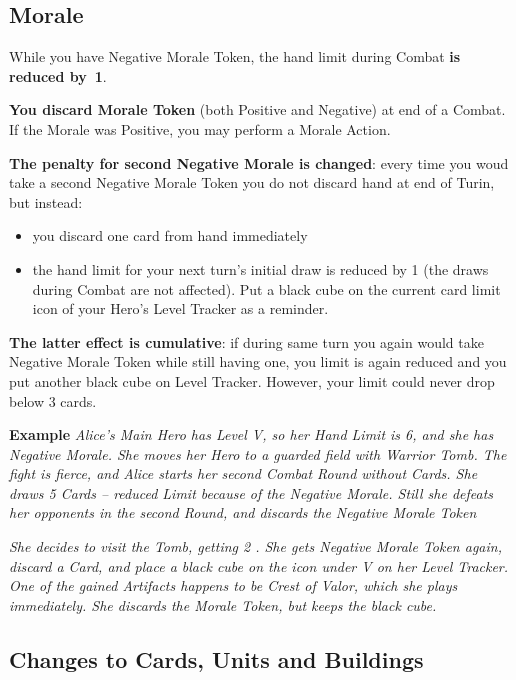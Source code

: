 \begin{multicols*}{2}
    \subsection*{Morale}
    
    While you have Negative Morale Token, the hand limit during Combat \textbf{is reduced by~1}.
    
    \textbf{You discard Morale Token} (both Positive and Negative) at end of a Combat. If the Morale was Positive, you may perform a Morale Action.
    
    \textbf{The penalty for second Negative Morale is changed}: every time you woud take a second Negative Morale Token you do not discard hand at end of Turin, but instead:
    \begin{itemize}
        \item you discard one card from hand immediately
        \item the hand limit for your next turn's initial draw is reduced by 1 (the draws during Combat are not affected). Put a black cube on the current card limit icon of your Hero's Level Tracker as a reminder. 
    \end{itemize} 
    \textbf{The latter effect is cumulative}: if during same turn you again would take Negative Morale Token while still having one, you limit is again reduced and you put another black cube on Level Tracker. However, your limit could never drop below 3 cards.
    
    \textbf{Example} \textit{Alice's Main Hero has Level V, so her Hand Limit is 6, and she has Negative Morale. She moves her Hero to a guarded field with Warrior Tomb. The fight is fierce, and Alice starts her second Combat Round without Cards. She draws 5 Cards -- reduced Limit because of the Negative Morale. Still she defeats her opponents in the second Round, and discards the Negative Morale Token}
    
    \textit{She decides to visit the Tomb, getting 2 . She gets Negative Morale Token again, discard a Card, and place a black cube on the icon under V on her Level Tracker. One of the gained Artifacts happens to be Crest of Valor, which she plays immediately. She discards the Morale Token, but keeps the black cube.}
    
    \subsection*{Changes to Cards, Units and Buildings}
    

\end{multicols*}
